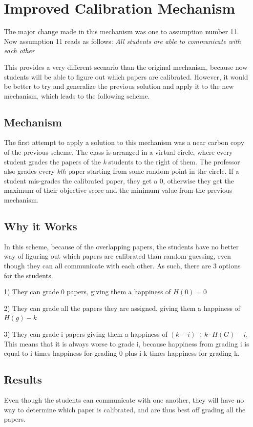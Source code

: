 \documentclass[12pt, Arial]{article}
\begin{document}
\section{Improved Calibration Mechanism}
The major change made in this mechanism was one to assumption number 11. Now assumption 11 reads as follows:
\emph{All students are able to communicate with each other}

This provides a very different scenario than the original mechanism, because now students will be able to figure out which papers are calibrated. However, it would be better to try and generalize the previous solution and apply it to the new mechanism, which leads to the following scheme.

\subsection{Mechanism}
The first attempt to apply a solution to this mechanism was a near carbon copy of the previous scheme.
The class is arranged in a virtual circle, where every student grades the papers of the \emph{k} students to the right of them. The professor also grades every \emph{kth} paper starting from some random point in the circle. If a student mis-grades the calibrated paper, they get a 0, otherwise they get the maximum of their objective score and the minimum value from the previous mechanism.

\subsection{Why it Works}
In this scheme, because of the overlapping papers, the students have no better way of figuring out which papers are calibrated than random guessing, even though they can all communicate with each other. As such, there are 3 options for the students.

1) They can grade 0 papers, giving them a happiness of $H(0) = 0$

2) They can grade all the papers they are assigned, giving them a happiness of $H(g) - k$

3) They can grade i papers giving them a happiness of $(k-i)\div k \cdot H(G)-i$. This means that it is always worse to grade i, because happiness from grading i is equal to i times happiness for grading 0 plus i-k times happiness for grading k.

\subsection{Results}
Even though the students can communicate with one another, they will have no way to determine which paper is calibrated, and are thus best off grading all the papers.
\end{document}
